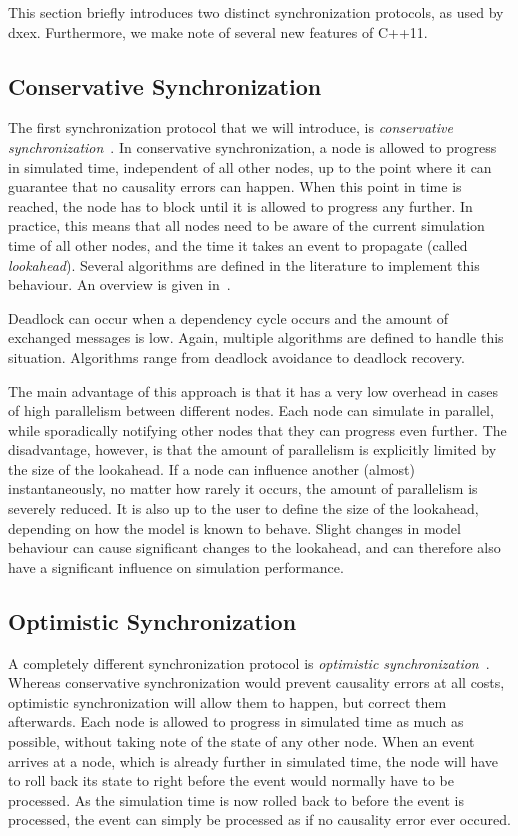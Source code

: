 This section briefly introduces two distinct synchronization protocols, as used by dxex.
Furthermore, we make note of several new features of C++11.

\subsection{Conservative Synchronization}
The first synchronization protocol that we will introduce, is \textit{conservative synchronization}~\cite{FujimotoBook}.
In conservative synchronization, a node is allowed to progress in simulated time, independent of all other nodes, up to the point where it can guarantee that no causality errors can happen.
When this point in time is reached, the node has to block until it is allowed to progress any further.
In practice, this means that all nodes need to be aware of the current simulation time of all other nodes, and the time it takes an event to propagate (called \textit{lookahead}).
Several algorithms are defined in the literature to implement this behaviour.
An overview is given in~\cite{FujimotoBook}.

Deadlock can occur when a dependency cycle occurs and the amount of exchanged messages is low.
Again, multiple algorithms are defined to handle this situation.
Algorithms range from deadlock avoidance to deadlock recovery.

The main advantage of this approach is that it has a very low overhead in cases of high parallelism between different nodes.
Each node can simulate in parallel, while sporadically notifying other nodes that they can progress even further.
The disadvantage, however, is that the amount of parallelism is explicitly limited by the size of the lookahead.
If a node can influence another (almost) instantaneously, no matter how rarely it occurs, the amount of parallelism is severely reduced.
It is also up to the user to define the size of the lookahead, depending on how the model is known to behave.
Slight changes in model behaviour can cause significant changes to the lookahead, and can therefore also have a significant influence on simulation performance.

\subsection{Optimistic Synchronization}
A completely different synchronization protocol is \textit{optimistic synchronization}~\cite{TimeWarp}.
Whereas conservative synchronization would prevent causality errors at all costs, optimistic synchronization will allow them to happen, but correct them afterwards.
Each node is allowed to progress in simulated time as much as possible, without taking note of the state of any other node.
When an event arrives at a node, which is already further in simulated time, the node will have to roll back its state to right before the event would normally have to be processed.
As the simulation time is now rolled back to before the event is processed, the event can simply be processed as if no causality error ever occured.

